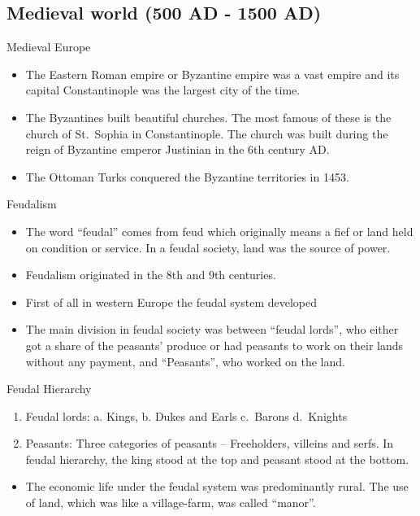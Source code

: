 \documentclass[
  openany]{book}
\providecommand{\tightlist}{%
  \setlength{\itemsep}{0pt}\setlength{\parskip}{0pt}}
\begin{document}
\hypertarget{medieval-world-500-ad---1500-ad}{%
\subsection{Medieval world (500 AD - 1500 AD)}\label{medieval-world-500-ad---1500-ad}}

Medieval Europe

\begin{itemize}
\tightlist
\item
  The Eastern Roman empire or Byzantine empire was a vast empire and its capital Constantinople was the largest city of the time.
\item
  The Byzantines built beautiful churches. The most famous of these is the church of St.~Sophia in Constantinople. The church was built during the reign of Byzantine emperor Justinian in the 6th century AD.
\item
  The Ottoman Turks conquered the Byzantine territories in 1453.
\end{itemize}

Feudalism

\begin{itemize}
\tightlist
\item
  The word ``feudal'' comes from feud which originally means a fief or land held on condition or service. In a feudal society, land was the source of power.
\item
  Feudalism originated in the 8th and 9th centuries.
\item
  First of all in western Europe the feudal system developed
\item
  The main division in feudal society was between ``feudal lords'', who either got a share of the peasants' produce or had peasants to work on their lands without any payment, and ``Peasants'', who worked on the land.
\end{itemize}

Feudal Hierarchy

\begin{enumerate}
\def\labelenumi{\arabic{enumi}.}
\tightlist
\item
  Feudal lords: a. Kings, b. Dukes and Earls c.~Barons d.~Knights
\item
  Peasants: Three categories of peasants -- Freeholders, villeins and serfs. In feudal hierarchy, the king stood at the top and peasant stood at the bottom.
\end{enumerate}

\begin{itemize}
\tightlist
\item
  The economic life under the feudal system was predominantly rural. The use of land, which was like a village-farm, was called ``manor''.
\end{itemize}
\end{document}
